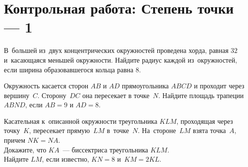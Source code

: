 
\section*{Контрольная работа: Степень точки --- 1}


\begin{problems}



\item
В~большей из~двух концентрических окружностей проведена хорда, равная $32$
и~касающаяся меньшей окружности.
Найдите радиус каждой из~окружностей, если ширина образовавшегося кольца
равна $8$.

\item
Окружность касается сторон $AB$ и $AD$ прямоугольника $ABCD$ и проходит через
вершину~$C$.
Сторону~$DC$ она пересекает в точке~$N$.
Найдите площадь трапеции $ABND$, если $AB = 9$ и $AD = 8$.

\item
Касательная к~описанной окружности треугольника $KLM$, проходящая через
точку~$K$, пересекает прямую~$LM$ в~точке~$N$.
На~стороне~$LM$ взята точка~$A$, причем $NK = NA$.
\\
\subproblem
Докажите, что $KA$~--- биссектриса треугольника $KLM$.
\\
\subproblem
Найдите $LM$, если известно, $KN = 8$ и~$KM = 2 KL$.

\end{problems}

